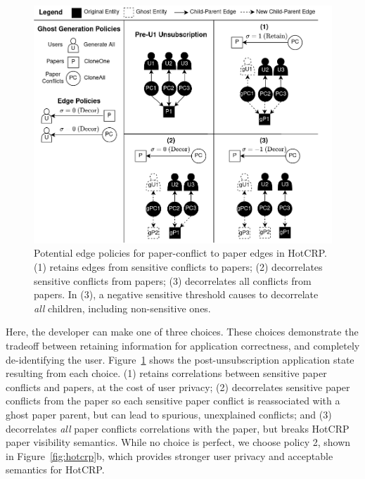 \iffalse
\begin{figure}[t!]
    \centering
    \includegraphics[width=.5\textwidth]{img/pcs}

    \caption{Potential edge policies for paper-conflict to paper edges in HotCRP.
    (1) retains edges from sensitive conflicts to papers; (2) decorrelates sensitive
    conflicts from papers; (3) decorrelates all conflicts from papers.
    In (3), a negative sensitive threshold causes \sys to
decorrelate \emph{all} children, including non-sensitive ones.}
    \label{fig:pcs}
\end{figure}

Here, the developer can make one of three choices. 
These choices demonstrate the tradeoff between retaining information for application correctness, and completely de-identifying the user.
Figure~\ref{fig:pcs} shows the post-unsubscription application state resulting from each choice.
%
(1) retains correlations between sensitive paper conflicts and papers, at the cost of
user privacy; (2) decorrelates sensitive paper conflicts from the paper so each
sensitive paper conflict is reassociated with a ghost paper parent, but can lead to spurious,
unexplained conflicts; and (3) decorrelates \emph{all} paper conflicts correlations
with the paper, but breaks HotCRP paper visibility semantics.
While no choice is perfect, we choose policy 2, shown in Figure~\ref{fig:hotcrp}b, which provides
stronger user privacy and acceptable semantics for HotCRP.

